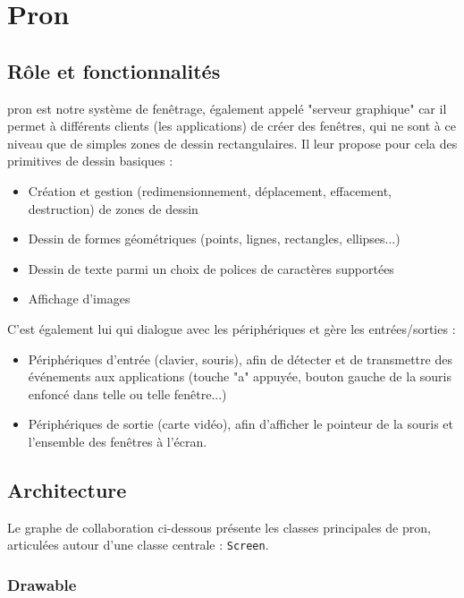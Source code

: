 \section{Pron}

\subsection{Rôle et fonctionnalités}

pron est notre système de fenêtrage, également appelé "serveur graphique" car il permet à différents clients (les applications) de créer des fenêtres, qui ne sont à ce niveau que de simples zones de dessin rectangulaires. Il leur propose pour cela des primitives de dessin basiques :
\begin{itemize}
\item Création et gestion (redimensionnement, déplacement, effacement, destruction) de zones de dessin
\item Dessin de formes géométriques (points, lignes, rectangles, ellipses...)
\item Dessin de texte parmi un choix de polices de caractères supportées
\item Affichage d'images
\end{itemize}

C'est également lui qui dialogue avec les périphériques et gère les entrées/sorties :
\begin{itemize}
  \item Périphériques d'entrée (clavier, souris), afin de détecter et de transmettre des événements aux applications (touche "a" appuyée, bouton gauche de la souris enfoncé dans telle ou telle fenêtre...)
  \item Périphériques de sortie (carte vidéo), afin d'afficher le pointeur de la souris et l'ensemble des fenêtres à l'écran.
\end{itemize}

\subsection{Architecture}

Le graphe de collaboration ci-dessous présente les classes principales de pron, articulées autour d'une classe centrale : \verb|Screen|.

\subsubsection{Drawable}

